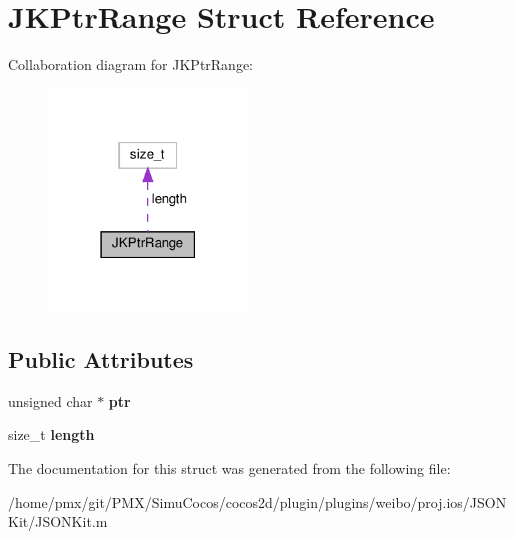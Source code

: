 \hypertarget{structJKPtrRange}{}\section{J\+K\+Ptr\+Range Struct Reference}
\label{structJKPtrRange}


Collaboration diagram for J\+K\+Ptr\+Range\+:
\nopagebreak
\begin{figure}[H]
\begin{center}
\leavevmode
\includegraphics[width=150pt]{structJKPtrRange__coll__graph}
\end{center}
\end{figure}
\subsection*{Public Attributes}
\begin{DoxyCompactItemize}
\item 
\mbox{\label{structJKPtrRange_adb05c5c3ef7a0b101fffce1675070ec3}} 
unsigned char $\ast$ {\bfseries ptr}
\item 
\mbox{\label{structJKPtrRange_a5e17381910c1986b7564ee7fb0201bdb}} 
size\+\_\+t {\bfseries length}
\end{DoxyCompactItemize}


The documentation for this struct was generated from the following file\+:\begin{DoxyCompactItemize}
\item 
/home/pmx/git/\+P\+M\+X/\+Simu\+Cocos/cocos2d/plugin/plugins/weibo/proj.\+ios/\+J\+S\+O\+N\+Kit/J\+S\+O\+N\+Kit.\+m\end{DoxyCompactItemize}

